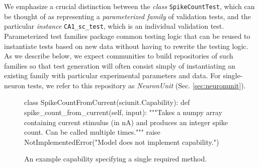 \documentclass[11pt,letterpaper]{article}
\let\verbx\lstinline
\begin{document}
We emphasize a crucial distinction between the \textit{class} \verbx{SpikeCountTest}, which can be thought of as representing a \emph{parameterized family} of validation tests, and the particular \textit{instance} \verbx{CA1_sc_test}, which is an individual validation test. Parameterized test families package common testing logic that can be reused to instantiate tests based on new data without having to rewrite the testing logic. As we describe below, we expect communities to build repositories of such families so that test generation will often consist simply of instantiating an existing family with particular experimental parameters and data. For single-neuron tests, we refer to this repository as \textit{NeuronUnit} (Sec. \ref{sec:neuronunit}). 

%
\begin{figure}
\begin{python}
class SpikeCountFromCurrent(sciunit.Capability):
  def spike_count_from_current(self, input): 
    """Takes a numpy array containing current stimulus (in nA) and
    produces an integer spike count. Can be called multiple times."""
    raise NotImplementedError("Model does not implement capability.")
\end{python}
\caption{An example capability specifying a single required method.}
\label{fig:capability}
\end{figure}
\end{document}
